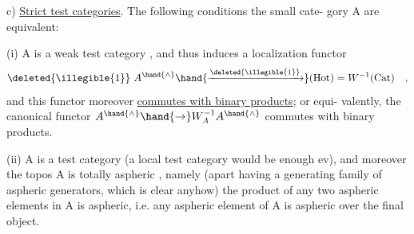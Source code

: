 c)   \uline{Strict test categories}.   The following conditions  the small cate-%
gory A are equivalent:

(i)   A is a weak test category ,  and thus induces a localization
functor
\[ \deleted{\illegible{1}}\ A^{\hand{\wedge}} \hand{\xrightarrow{\deleted{\illegible{1}}}} (\mathrm{Hot}) = W^{-1}(\mathrm{Cat}) \quad , \]
and this functor moreover \uline{commutes with binary products};  or equi-%
valently,  the canonical functor $A^{\hand{\wedge}} \hand{\to} W_A^{-1}A^{\hand{\wedge}}$\hand{/} commutes with binary
products.

(ii)  A is a test category (a local test category would be enough
ev),  and moreover the topos A\hand{\ensuremath{^{\wedge}}} is totally aspheric \inserted{[Section 35]}, namely
(apart  having a generating family of aspheric generators,  which
is clear anyhow)  the product of any two aspheric elements in A\hand{\ensuremath{^{\wedge}}}
is aspheric,  i.e. any aspheric element of A\hand{\ensuremath{^{\wedge}}}\hand{/} is aspheric over the
final object.
